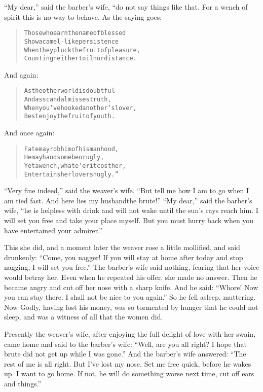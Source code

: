 \documentclass[article, twoside, 14pt]{memoir}
\renewenvironment{verbatim}{%
\begin{quote}%
\vskip -10pt%
\begin{alltt}\normalfont\large}{\end{alltt}%
\end{quote}%
\vskip -10pt
} %
\begin{document}
``My dear,'' said the barber's wife, “do not say things like that.
For a wench of spirit this is no way to behave. As the saying
goes:

\begin{verbatim}
Those who earn the name of blessed
    Show a camel-like persistence
When they pluck the fruit of pleasure,
    Counting neither toil nor distance.
\end{verbatim}
And again:

\begin{verbatim}
As the other world is doubtful
    And as scandal misses truth,
When you've hooked another's lover,
    Best enjoy the fruit of youth.
\end{verbatim}
And once again:

\begin{verbatim}
Fate may rob him of his manhood,
He may handsome be or ugly,
Yet a wench, whate'er it cost her,
Entertains her lover snugly.”
\end{verbatim}
``Very fine indeed,'' said the weaver's wife.
``But tell me how I am to go when I am tied fast. And here lies my husband{\textemdash}the brute!''
``My dear,'' said the barber's wife,
``he is helpless with drink and will not wake until the sun's rays reach him. I will set you free and take your place myself. But you must hurry back when you have entertained your admirer.''

This she did, and a moment later the weaver rose a little
mollified, and said drunkenly:
``Come, you nagger! If you will stay at home after today and stop nagging, I will set you free.''
The barber's wife said nothing, fearing that her voice would betray
her. Even when he repeated his offer, she made no answer. Then he
became angry and cut off her nose with a sharp knife. And he said:
``Whore! Now you can stay there. I shall not be nice to you again.''
So he fell asleep, muttering. Now Godly, having lost his money, was
so tormented by hunger that he could not sleep, and was a witness
of all that the women did.

Presently the weaver's wife, after enjoying the full delight of
love with her swain, came home and said to the barber's wife:
``Well, are you all right? I hope that brute did not get up while I was gone.''
And the barber's wife answered:
``The rest of me is all right. But I've lost my nose. Set me free quick, before he wakes up. I want to go home. If not, he will do something worse next time, cut off ears and things.''
\end{document}
